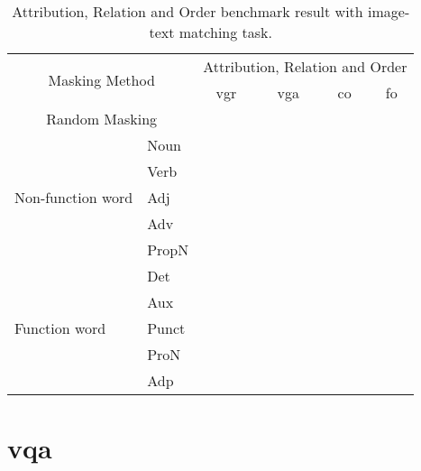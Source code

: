 \begin{table}[]
    \centering
    \label{tab:relation}
    \caption{Attribution, Relation and Order benchmark result with image-text matching task.}
    \begin{tabular}{ll|cccc}
        \multicolumn{2}{c|}{\multirow{2}{*}{Masking Method}} & \multicolumn{4}{c}{Attribution, Relation and Order} \\
        \multicolumn{2}{l|}{} & \acrshort{vgr} & \acrshort{vga} & \acrshort{co} & \acrshort{fo} \\
        \hline
        \multicolumn{2}{c|}{Random Masking} & & & & \\
        \hline
        \multirow{5}{*}{Non-function word} & Noun & & & & \\
        & Verb & & & & \\
        & Adj & & & & \\
        & Adv & & & & \\
        & PropN & & & & \\
        \hline
        \multirow{5}{*}{Function word} & Det & & & & \\
        & Aux & & & & \\
        & Punct & & & & \\
        & ProN & & & & \\
        & Adp & & & & \\
    \end{tabular}
\end{table}

\section{\Acrlong{vqa}}

